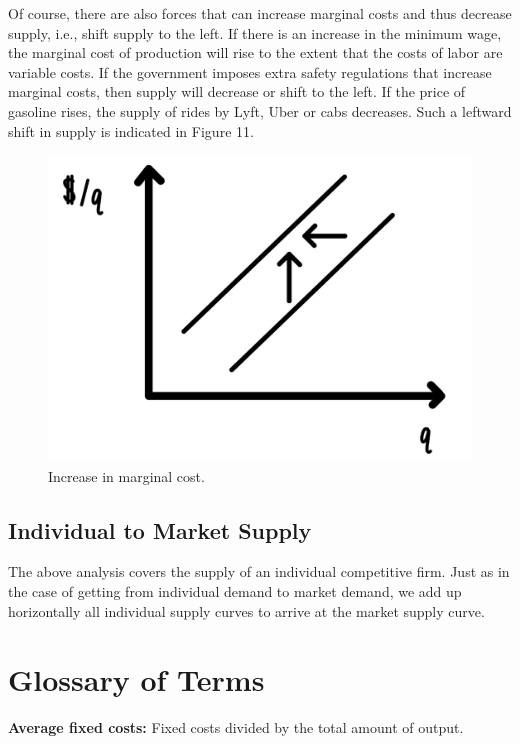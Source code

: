\documentclass[
]{book}
\begin{document}
Of course, there are also forces that can increase marginal costs and thus decrease supply, i.e., shift supply to the left. If there is an increase in the minimum wage, the marginal cost of production will rise to the extent that the costs of labor are variable costs. If the government imposes extra safety regulations that increase marginal costs, then supply will decrease or shift to the left. If the price of gasoline rises, the supply of rides by Lyft, Uber or cabs decreases. Such a leftward shift in supply is indicated in Figure 11.

\begin{figure}

{\centering \includegraphics[width=0.75\linewidth]{img/ch4/fig11} 

}

\caption{Increase in marginal cost.}\label{fig:fig411}
\end{figure}

\hypertarget{individual-to-market-supply}{%
\subsection{Individual to Market Supply}\label{individual-to-market-supply}}

The above analysis covers the supply of an individual competitive firm. Just as in the case of getting from individual demand to market demand, we add up horizontally all individual supply curves to arrive at the market supply curve.

\hypertarget{glossary-of-terms-4}{%
\section{Glossary of Terms}\label{glossary-of-terms-4}}

\textbf{Average fixed costs:} Fixed costs divided by the total amount of output.
\end{document}
